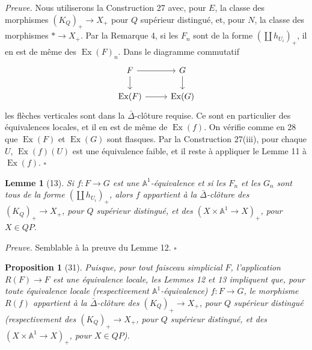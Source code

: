 \documentclass[11pt]{article}
\newcommand{\Aone}{\mathbb A^1}
\theoremstyle{deligne}
\newtheorem*{proposition*}{Proposition}
\newtheorem*{lemma*}{Lemme}
\newenvironment{proofdel}{\noindent\textit{Preuve.}}{\hfill$\square$}
\newcommand{\Ex}{\operatorname{Ex}}
\begin{document}
\begin{proofdel}
Nous utiliserons la Construction 27 avec, pour \(E\), la classe des morphismes \((K_Q)_+\to X_+\) pour \(Q\) supérieur distingué, et, pour \(N\), la classe des morphismes \(*\to X_+\). Par la Remarque 4, si les \(F_n\) sont de la forme \((\coprod h_{U_i})_+\), il en est de même des \(\Ex(F)_n\). Dans le diagramme commutatif
\[
\begin{tikzcd}[column sep=2.6em,row sep=1.6em]
F \arrow[r] \arrow[d] & G \arrow[d] \\
\Ex(F) \arrow[r] & \Ex(G)
\end{tikzcd}
\]
les flèches verticales sont dans la \(\bar\Delta\)-clôture requise. Ce sont en particulier des équivalences locales, et il en est de même de \(\Ex(f)\). On vérifie comme en 28 que \(\Ex(F)\) et \(\Ex(G)\) sont flasques. Par la Construction 27(iii), pour chaque \(U\), \(\Ex(f)(U)\) est une équivalence faible, et il reste à appliquer le Lemme 11 à \(\Ex(f)\).
\end{proofdel}

\begin{lemma*}[13]
Si \(f:F\to G\) est une \(\Aone\)-équivalence et si les \(F_n\) et les \(G_n\) sont tous de la forme \((\coprod h_{U_i})_+\), alors \(f\) appartient à la \(\bar\Delta\)-clôture des \((K_Q)_+\to X_+\), pour \(Q\) supérieur distingué, et des \((X\times\Aone\to X)_+\), pour \(X\in QP\).
\end{lemma*}

\begin{proofdel}
Semblable à la preuve du Lemme 12.
\end{proofdel}

\begin{proposition*}[31]
Puisque, pour tout faisceau simplicial \(F\), l'application \(R(F)\to F\) est une équivalence locale, les Lemmes 12 et 13 impliquent que, pour toute équivalence locale (respectivement \(\Aone\)-équivalence) \(f:F\to G\), le morphisme \(R(f)\) appartient à la \(\bar\Delta\)-clôture des \((K_Q)_+\to X_+\), pour \(Q\) supérieur distingué (respectivement des \((K_Q)_+\to X_+\), pour \(Q\) supérieur distingué, et des \((X\times\Aone\to X)_+\), pour \(X\in QP\)).
\end{proposition*}
\end{document}
